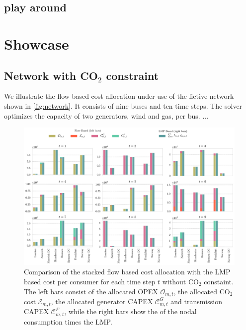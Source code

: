 \documentclass[11pt]{article}
\newcommand{\allocateCapexGeneration}{\mathcal{C}^{G}_{m,t}}
\newcommand{\allocateCapexFlow}{\mathcal{C}^{F}_{m,t}}
\newcommand{\allocateOpex}{\mathcal{O}_{m,t}}
\newcommand{\allocateEmissionCost}{\mathcal{E}_{m,t}}
\begin{document}
\subsection*{play around}



\section*{Showcase}

\subsection*{Network with CO$_2$ constraint}
We illustrate the flow based cost allocation under use of the fictive network shown in \cref{fig:network}. It consists of nine buses and ten time steps. The solver optimizes the capacity of two generators, wind and gas, per bus. ...   

\begin{figure}[h]
    \centering
    \includegraphics[width=\textwidth]{compare_allocation.png}
    \caption{Comparison of the stacked flow based cost allocation with the LMP based cost per consumer for each time step $t$ without CO$_2$ constaint. The left bars consist of the allocated OPEX $\allocateOpex$, the allocated CO$_2$ cost $\allocateEmissionCost$, the allocated generator CAPEX $\allocateCapexGeneration$ and transmission CAPEX $\allocateCapexFlow$, while the right bars show the of the nodal consumption times the LMP. }
    \label{fig:cost_allocation}
\end{figure}
\end{document}
